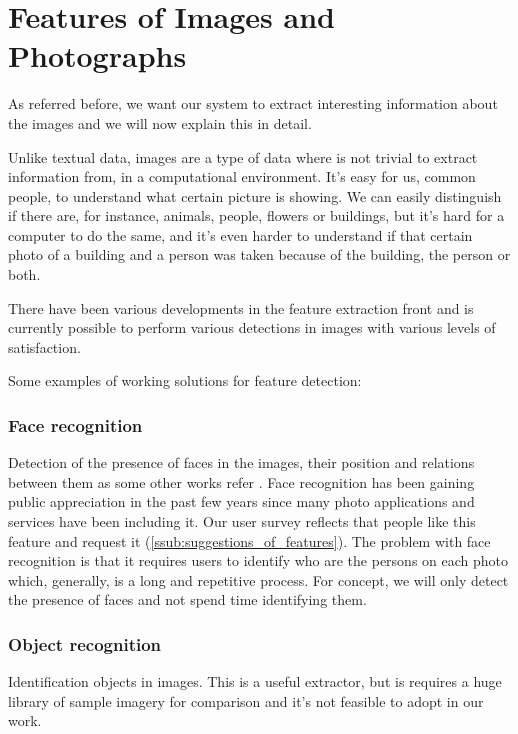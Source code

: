 



\section{Features of Images and Photographs}
\label{reqs:features}

As referred before, we want our system to extract interesting information about the images and we will now explain this in detail.


Unlike textual data, images are a type of data where is not trivial to extract information from, in a computational environment. It's easy for us, common people, to understand what certain picture is showing. We can easily distinguish if there are, for instance, animals, people, flowers or buildings, but it's hard for a computer to do the same, and it's even harder to understand if that certain photo of a building and a person was taken because of the building, the person or both.

There have been various developments in the feature extraction front \cite{Liu:2007p3740,Datta:2005p3749,Rui:1999p949} and is currently possible to perform various detections in images with various levels of satisfaction.

Some examples of working solutions for feature detection:

\subsubsection{Face recognition}
Detection of the presence of faces in the images, their position and relations between them as some other works refer \cite{Vasconcelos:2005in,Chen:2003p3699,Tamura:2002p859,Hsu:2002p3675}. Face recognition has been gaining public appreciation in the past few years since many photo applications and services have been including it. Our user survey reflects that people like this feature and request it (\ref{ssub:suggestions_of_features}). The problem with face recognition is that it requires users to identify who are the persons on each photo which, generally, is a long and repetitive process. For concept, we will only detect the presence of faces and not spend time identifying them.

\subsubsection{Object recognition}
Identification objects in images. This is a useful extractor, but is requires a huge library of sample imagery for comparison \cite{Torralba:2008p527} and it's not feasible to adopt in our work.
	
